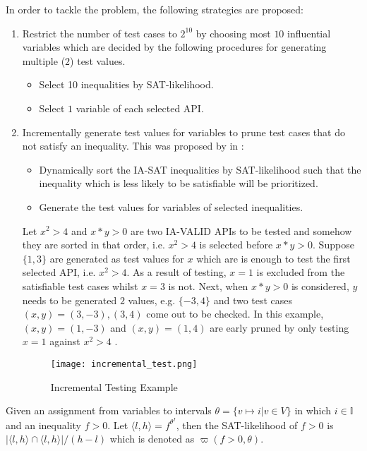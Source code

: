 In order to tackle the problem, the following strategies are proposed:
\begin{enumerate}
\item Restrict the number of test cases to $2^{10}$ by choosing most $10$ influential variables which are decided by the following procedures for generating multiple ($2$) test values.
\begin{itemize}
\item Select 10 inequalities by SAT-likelihood.
\item Select $1$ variable of each selected API.
\end{itemize}
\item Incrementally generate test values for variables to prune test cases that do not satisfy an inequality. This was proposed by \citeauthor{khanhReport} in \cite{khanhReport}:
\begin{itemize}
\item Dynamically sort the IA-SAT inequalities by SAT-likelihood such that the inequality which is less likely to be satisfiable will be prioritized.
\item Generate the test values for variables of selected inequalities.
\end{itemize}
\begin{example}
Let $x^2 > 4$ and $x*y > 0$ are two IA-VALID APIs to be tested and somehow they are sorted in that order, i.e. $x^2 > 4$ is selected before $x*y > 0$. Suppose $\{1, 3\}$ are generated as test values for $x$ which are is enough to test the first selected API, i.e. $x^2 > 4$. As a result of testing, $x = 1$ is excluded from the satisfiable test cases whilst $x = 3$ is not. Next, when $x*y > 0$ is considered, $y$ needs to be generated $2$ values, e.g. $\{-3, 4\}$ and two test cases $(x, y) = (3, -3), (3, 4)$ come out to be checked. In this example, $(x, y) = (1, -3)$ and  $(x, y) = (1, 4)$ are early pruned by only testing $x = 1$ against $x^2 > 4$ .
\end{example}
\begin{figure}[ht]
\centering
\texttt{[image: incremental\_test.png]} 
\caption{Incremental Testing Example} 
\label{fig:incremental-test} 
\end{figure} 
\end{enumerate}

\begin{definition}
Given an assignment from variables to intervals $\theta = \{v \mapsto i | v \in V\}$ in which $i \in \mathbb{I}$ and an inequality $f > 0$. Let $\langle l, h \rangle = f^{\theta^I}$, then the SAT-likelihood of $f > 0$ is $|\langle l, h \rangle \cap \langle l, h \rangle| / (h - l)$ which is denoted as $\varpi(f>0, \theta)$.
\end{definition}

